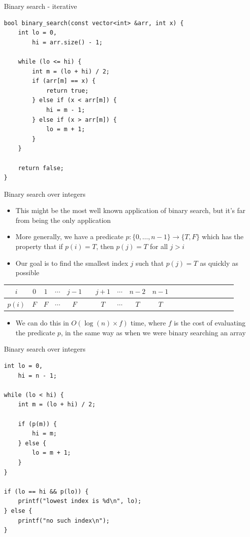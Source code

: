 \documentclass[10pt]{beamer}
\newcommand{\bi}{\begin{itemize}}
\newcommand{\ei}{\end{itemize}}
\begin{document}
\begin{frame}[fragile]{Binary search - iterative}
    \begin{verbatim}
bool binary_search(const vector<int> &arr, int x) {
    int lo = 0,
        hi = arr.size() - 1;

    while (lo <= hi) {
        int m = (lo + hi) / 2;
        if (arr[m] == x) {
            return true;
        } else if (x < arr[m]) {
            hi = m - 1;
        } else if (x > arr[m]) {
            lo = m + 1;
        }
    }

    return false;
}
    \end{verbatim}
\end{frame}

\begin{frame}{Binary search over integers}
    \bi
        \item This might be the most well known application of binary search, but it's far from being the only application
        \item More generally, we have a predicate $p : \{0,\ldots,n-1\} \rightarrow \{T, F\}$ which has the property that if $p(i) = T$, then $p(j) = T$ for all $j > i$
        \item Our goal is to find the smallest index $j$ such that $p(j) = T$ as quickly as possible
    \ei

    \begin{center}
        \begin{tabular}{ccccccccccccccccccc}
            $i$ & $0$ & $1$ & $\cdots$ & $j-1$ & \color{vhilight}{$j$} & $j+1$ & $\cdots$ & $n-2$ & $n-1$ \\
            \hline
            $p(i)$ & $F$ & $F$ & $\cdots$ & $F$ & \color{vhilight}{$T$} & $T$ & $\cdots$ & $T$ & $T$ \\
        \end{tabular}
    \end{center}

    \bi
        \item We can do this in $O(\log(n) \times f)$ time, where $f$ is the cost of evaluating the predicate $p$, in the same way as when we were binary searching an array
    \ei
\end{frame}

\begin{frame}[fragile]{Binary search over integers}
    \begin{verbatim}
int lo = 0,
    hi = n - 1;

while (lo < hi) {
    int m = (lo + hi) / 2;

    if (p(m)) {
        hi = m;
    } else {
        lo = m + 1;
    }
}

if (lo == hi && p(lo)) {
    printf("lowest index is %d\n", lo);
} else {
    printf("no such index\n");
}
    \end{verbatim}
\end{frame}
\end{document}
